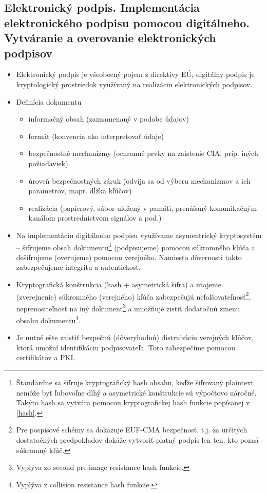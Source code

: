 \documentclass[12pt,a4paper]{article}
\begin{document}
{    \subsection{Elektronický podpis. Implementácia elektronického podpisu pomocou digitálneho. Vytváranie a overovanie elektronických podpisov}
    \begin{itemize}
        \item Elektronický podpis je všeobecný pojem z direktívy EÚ, digitálny podpis je kryptologický prostriedok využívaný na realizáciu elektronických podpisov.
        \item Definícia dokumentu
        \begin{itemize}
            \item informačný obsah (zaznamenaný v podobe údajov)
            \item formát (konvencia ako interpretovať údaje)
            \item bezpečnostné mechanizmy (ochranné prvky na zaistenie CIA, príp. iných požiadaviek)
            \item úroveň bezpečnostných záruk (odvíja sa od výberu mechanizmov a ich parametrov, mapr. dĺžka kľúčov)
            \item realizácia (papierový, súbor uložený v pamäti, prenášaný komunikačným kanálom prostredníctvom signálov a pod.)
        \end{itemize}
        \item Na implementáciu digitálneho podpisu využívame asymentrický kryptosystém -- šifrujeme obsah dokumentu\footnote{Štandardne sa šifruje kryptografický hash obsahu, keďže šifrovaný plaintext nemôže byť ľubovoľne dlhý a asymetrické konštrukcie sú výpočtovo náročné. Takýto hash sa vytvára pomocou kryptografickej hash funkcie popísanej v \ref{hash}.} (podpisujeme) pomocou súkromného kľúča a dešifrujeme (overujeme) pomocou verejného. Namiesto dôvernosti takto zabezpečujeme integritu a autentickosť. 
        \item Kryptografická konštrukcia (hash + asymetrická šifra) a utajenie (zverejnenie) súkromného (verejného) kľúča  zabezpečujú nefalšovateľnosť\footnote{Pre pospisové schémy sa dokazuje EUF-CMA bezpečnosť, t.j. za určitých dostatočných predpokladov dokáže vytvoriť platný podpis len ten, kto pozná súkromný kľúč.}, neprenositeľnosť na iný dokument\footnote{Vyplýva zo second pre-image resistance hash funkcie.} a umožňujé zistiť dodatočnú zmenu obsahu dokumentu\footnote{Vyplýva z collision resistance hash funkcie.}.
        \item Je nutné ešte zaistiť bezpečnú (dôveryhodnú) distrubúciu verejných kľúčov, ktorá umožní identifikáciu podpisovateľa. Toto zabezpečíme pomocou certifikátov a PKI.
    \end{itemize}
}
\end{document}
